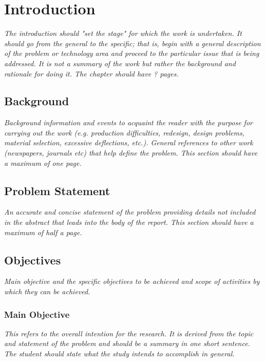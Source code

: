 \chapter{Introduction}
\label{cha:Introduction}      %

\emph{The introduction should "set the stage" for which the work is undertaken.
	It should go from the general to the specific; that is, begin with a general description of the problem or technology area and proceed to the particular issue that is being addressed.
	It is not a summary of the work but rather the background and rationale for doing it.
	The chapter should have ? pages.}

\section{Background}
\emph{Background information and events to acquaint the reader with the purpose for carrying out the work (e.g. production difficulties, redesign, design problems, material selection, excessive deflections, etc.).
General references to other work (newspapers, journals etc) that help define the problem.
This section should have a maximum of one page.}

\section{Problem Statement}
\emph{An accurate and concise statement of the problem providing details not included in the abstract that leads into the body of the report.
This section should have a maximum of half a page.}

\section{Objectives}
\emph{Main objective and the specific objectives to be achieved and scope of activities by which they can be achieved.}

\subsection{Main Objective}
\emph{This refers to the overall intention for the research.
	It is derived from the topic and statement of the problem and should be a summary in one short sentence.
	The student should state what the study intends to accomplish in general.}

